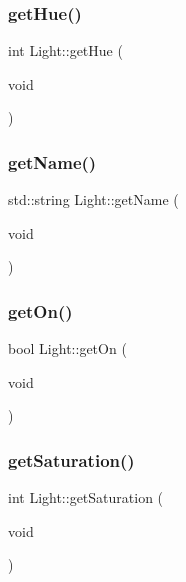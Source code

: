 \subsubsection{\texorpdfstring{get\+Hue()}{getHue()}}
{\footnotesize\ttfamily int Light\+::get\+Hue (\begin{DoxyParamCaption}\item[{void}]{ }\end{DoxyParamCaption})\hspace{0.3cm}{\ttfamily [inline]}}

\mbox{\label{class_light_a768a0219abfdc1684e90513995280b08}} 
\subsubsection{\texorpdfstring{get\+Name()}{getName()}}
{\footnotesize\ttfamily std\+::string Light\+::get\+Name (\begin{DoxyParamCaption}\item[{void}]{ }\end{DoxyParamCaption})\hspace{0.3cm}{\ttfamily [inline]}}

\mbox{\label{class_light_a4145a367202562504ccf4314f489d0eb}} 
\subsubsection{\texorpdfstring{get\+On()}{getOn()}}
{\footnotesize\ttfamily bool Light\+::get\+On (\begin{DoxyParamCaption}\item[{void}]{ }\end{DoxyParamCaption})\hspace{0.3cm}{\ttfamily [inline]}}

\mbox{\label{class_light_ab654f1c6ffbc3f79fc88d487449dd744}} 
\subsubsection{\texorpdfstring{get\+Saturation()}{getSaturation()}}
{\footnotesize\ttfamily int Light\+::get\+Saturation (\begin{DoxyParamCaption}\item[{void}]{ }\end{DoxyParamCaption})\hspace{0.3cm}{\ttfamily [inline]}}

